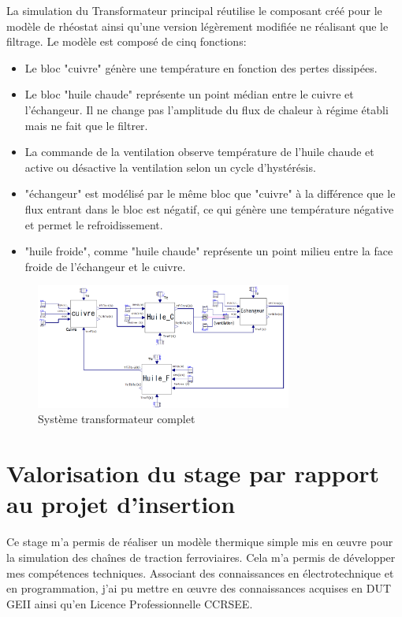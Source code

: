 \documentclass[a4paper]{report}
\begin{document}
	La simulation du Transformateur principal réutilise le composant créé pour le modèle de rhéostat ainsi qu'une version légèrement modifiée ne réalisant que le filtrage. Le modèle est composé de cinq fonctions:
	\begin{itemize}
		\item Le bloc "cuivre" génère une température en fonction des pertes dissipées.
		\item Le bloc "huile chaude" représente un point médian entre le cuivre et l'échangeur. Il ne change pas l'amplitude du flux de chaleur à régime établi mais ne fait que le filtrer.
		\item La commande de la ventilation observe température de l'huile chaude et active ou désactive la ventilation selon un cycle d'hystérésis.
		\item "échangeur" est modélisé par le même bloc que "cuivre" à la différence que le flux entrant dans le bloc est négatif, ce qui génère une température négative et permet le refroidissement.
		\item "huile froide", comme "huile chaude" représente un point milieu entre la face froide de l'échangeur et le cuivre.
	\end{itemize}
	\begin{figure}[h]
		\centering
		\includegraphics[width=0.75\textwidth]{tfp_modelica}
		\caption{Système transformateur complet}
		\label{tfp:modelica}
	\end{figure}
	\chapter{Valorisation du stage par rapport au projet d'insertion}
	
		Ce stage m'a permis de réaliser un modèle thermique simple mis en œuvre pour la simulation des chaînes de traction ferroviaires.
		Cela m'a permis de développer mes compétences techniques. Associant des connaissances en électrotechnique et en programmation, j'ai pu mettre en œuvre des connaissances acquises en DUT GEII ainsi qu'en Licence Professionnelle CCRSEE.\\
	
\end{document}
